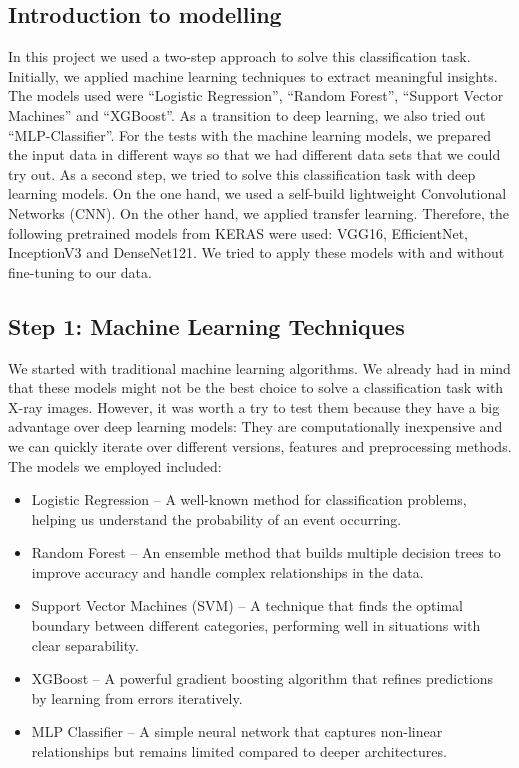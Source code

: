 \documentclass{article}
\begin{document}


\subsection{Introduction to modelling}
In this project we used a two-step approach to solve this classification task. Initially, we applied machine learning techniques to extract meaningful insights. The models used were “Logistic Regression”, “Random Forest”, “Support Vector Machines” and “XGBoost”. As a transition to deep learning, we also tried out “MLP-Classifier”. For the tests with the machine learning models, we prepared the input data in different ways so that we had different data sets that we could try out.
As a second step, we tried to solve this classification task with deep learning models. On the one hand, we used a self-build lightweight Convolutional Networks (CNN). On the other hand, we applied transfer learning. Therefore, the following pretrained models from KERAS were used: VGG16, EfficientNet, InceptionV3 and DenseNet121. We tried to apply these models with and without fine-tuning to our data. 


\subsection{Step 1: Machine Learning Techniques}
We started with traditional machine learning algorithms. We already had in mind that these models might not be the best choice to solve a classification task with X-ray images. However, it was worth a try to test them because they have a big advantage over deep learning models: They are computationally
inexpensive and we can quickly iterate over different versions, features and preprocessing methods. The models we employed included:

\begin{itemize}
    \item Logistic Regression – A well-known method for classification problems, helping us understand the probability of an event occurring.
    \item Random Forest – An ensemble method that builds multiple decision trees to improve accuracy and handle complex relationships in the data.
    \item Support Vector Machines (SVM) – A technique that finds the optimal boundary between different categories, performing well in situations with clear separability.
    \item XGBoost – A powerful gradient boosting algorithm that refines predictions by learning from errors iteratively.
    \item MLP Classifier – A simple neural network that captures non-linear relationships but remains limited compared to deeper architectures.
\end{itemize}
\end{document}
